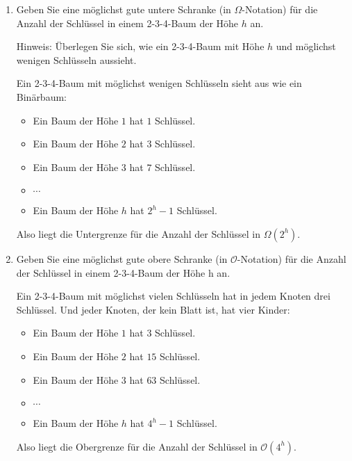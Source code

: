 \documentclass{bschlangaul-aufgabe}
\begin{document}
\begin{enumerate}

\item Geben Sie eine möglichst gute untere Schranke (in
$\Omega$-Notation) für die Anzahl der Schlüssel in einem 2-3-4-Baum der
Höhe $h$ an.

Hinweis: Überlegen Sie sich, wie ein 2-3-4-Baum mit Höhe $h$ und
möglichst wenigen Schlüsseln aussieht.

\begin{bAntwort}
Ein 2-3-4-Baum mit möglichst wenigen Schlüsseln sieht aus wie ein
Binärbaum:

\begin{itemize}
\item Ein Baum der Höhe $1$ hat $1$ Schlüssel.
\item Ein Baum der Höhe $2$ hat $3$ Schlüssel.
\item Ein Baum der Höhe $3$ hat $7$ Schlüssel.
\item $\cdots$
\item Ein Baum der Höhe $h$ hat $2^h - 1$ Schlüssel.
\end{itemize}

Also liegt die Untergrenze für die Anzahl der Schlüssel in
$\Omega(2^h)$.
\end{bAntwort}


\item Geben Sie eine möglichst gute obere Schranke (in
$\mathcal{O}$-Notation) für die Anzahl der Schlüssel in einem 2-3-4-Baum
der Höhe h an.

\begin{bAntwort}
Ein 2-3-4-Baum mit möglichst vielen Schlüsseln hat in jedem Knoten drei
Schlüssel. Und jeder Knoten, der kein Blatt ist, hat vier Kinder:

\begin{itemize}
\item Ein Baum der Höhe $1$ hat $3$ Schlüssel.
\item Ein Baum der Höhe $2$ hat $15$ Schlüssel.
\item Ein Baum der Höhe $3$ hat $63$ Schlüssel.
\item $\cdots$
\item Ein Baum der Höhe $h$ hat $4^h - 1$ Schlüssel.
\end{itemize}

Also liegt die Obergrenze für die Anzahl der Schlüssel in
$\mathcal{O}(4^h)$.
\end{bAntwort}

\end{enumerate}
\end{document}
